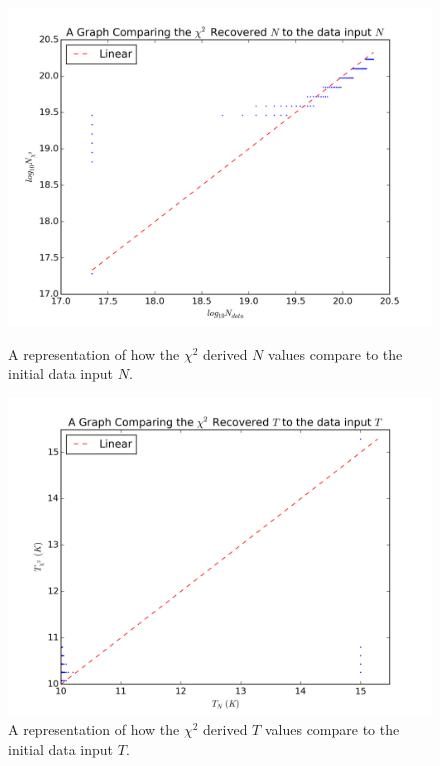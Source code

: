 \documentclass{report}
\begin{document}
\begin{figure}[H]
  \centering
  \includegraphics[width=\linewidth]{../img/sim/N.png}
  \caption{A representation of how the $\chi^{2}$ derived $N$ values compare to the initial data input $N$.}\label{fig:iso_T}
\endminipage\hfill
{}
  \includegraphics[width=\linewidth]{../img/sim/T.png}
  \caption{A representation of how the $\chi^{2}$ derived $T$ values compare to the initial data input $T$.}\label{fig:iso_N}
\endminipage
\end{figure}
\end{document}

